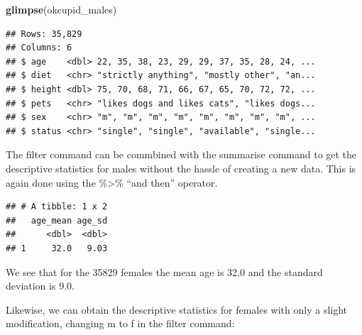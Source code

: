 \documentclass[
]{krantz}
\makeatletter
\newenvironment{Shaded}{\begin{snugshade}}{\end{snugshade}}
\newcommand{\DataTypeTok}[1]{\textcolor[rgb]{0.27,0.27,0.27}{#1}}
\newcommand{\KeywordTok}[1]{\textcolor[rgb]{0.27,0.27,0.27}{\textbf{#1}}}
\newcommand{\NormalTok}[1]{#1}
\newcommand{\OperatorTok}[1]{\textcolor[rgb]{0.43,0.43,0.43}{\textbf{#1}}}
\newcommand{\OtherTok}[1]{\textcolor[rgb]{0.37,0.37,0.37}{#1}}
\newcommand{\StringTok}[1]{\textcolor[rgb]{0.5,0.5,0.5}{#1}}
\newenvironment{kframe}{%
\medskip{}
\setlength{\fboxsep}{.8em}
 \def\at@end@of@kframe{}%
 \ifinner\ifhmode%
  \def\at@end@of@kframe{\end{minipage}}%
  \begin{minipage}{\columnwidth}%
 \fi\fi%
 \def\FrameCommand##1{\hskip\@totalleftmargin \hskip-\fboxsep
 \colorbox{shadecolor}{##1}\hskip-\fboxsep
     \hskip-\linewidth \hskip-\@totalleftmargin \hskip\columnwidth}%
 \MakeFramed {\advance\hsize-\width
   \@totalleftmargin\z@ \linewidth\hsize
   \@setminipage}}%
 {\par\unskip\endMakeFramed%
 \at@end@of@kframe}
\renewenvironment{Shaded}{\begin{kframe}}{\end{kframe}}
\makeatother
\begin{document}
\begin{Shaded}
\begin{Highlighting}[]
\KeywordTok{glimpse}\NormalTok{(okcupid_males)}
\end{Highlighting}
\end{Shaded}

\begin{verbatim}
## Rows: 35,829
## Columns: 6
## $ age    <dbl> 22, 35, 38, 23, 29, 29, 37, 35, 28, 24, ...
## $ diet   <chr> "strictly anything", "mostly other", "an...
## $ height <dbl> 75, 70, 68, 71, 66, 67, 65, 70, 72, 72, ...
## $ pets   <chr> "likes dogs and likes cats", "likes dogs...
## $ sex    <chr> "m", "m", "m", "m", "m", "m", "m", "m", ...
## $ status <chr> "single", "single", "available", "single...
\end{verbatim}

The filter command can be commbined with the summarise command to get the descriptive statistics for males without the hassle of creating a new data. This is again done using the \%\textgreater\% ``and then'' operator.

\begin{Shaded}
\end{Shaded}

\begin{verbatim}
## # A tibble: 1 x 2
##   age_mean age_sd
##      <dbl>  <dbl>
## 1     32.0   9.03
\end{verbatim}

We see that for the 35829 females the mean age is 32.0 and the standard deviation is 9.0.

Likewise, we can obtain the descriptive statistics for females with only a slight modification, changing m to f in the filter command:

\begin{Shaded}
\end{Shaded}
\end{document}
